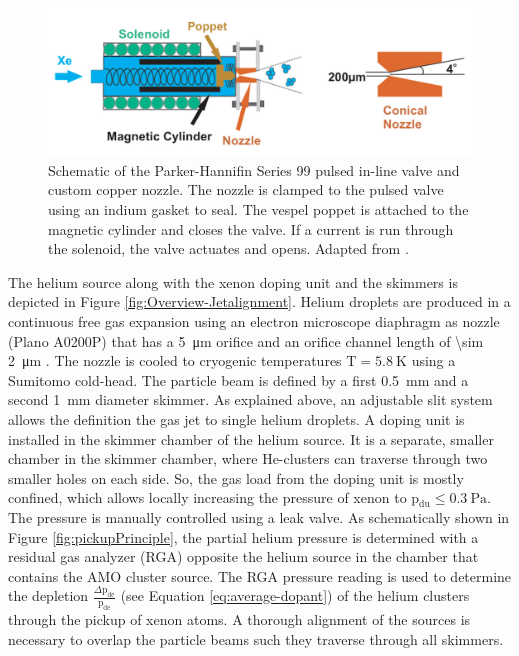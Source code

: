 \begin{figure}
	\centering
		\includegraphics[width=1.00\textwidth]{images/parker-valve.jpg}
	\caption[Schematic of the Parker-Hannifin Series 99 valve.]{Schematic of the Parker-Hannifin Series 99 pulsed in-line valve and custom copper nozzle. The nozzle is clamped to the pulsed valve using an indium gasket to seal. The vespel poppet is attached to the magnetic cylinder and closes the valve. If a current is run through the solenoid, the valve actuates and opens. Adapted from \citep[\href{http://creativecommons.org/licenses/by-nc/3.0/us}{\ccbync}]{Ferguson-2016-PhD}.}
	\label{fig:parker-valve}
\end{figure}
The helium source along with the xenon doping unit and the skimmers is depicted in Figure \ref{fig:Overview-Jetalignment}. Helium droplets are produced in a continuous free gas expansion using an electron microscope diaphragm as nozzle (Plano A0200P) that has a \SI{5}{\micro\meter} orifice and an orifice channel length of \SI{\sim 2}{\micro\meter} \citep{Gomez-2011-JCP}. The nozzle is cooled to cryogenic temperatures $\text{T}= \SI{5.8}{\kelvin}$ using a Sumitomo cold-head. The particle beam is defined by a first \SI{0.5}{\milli\meter} and a second \SI{1}{\milli\meter} diameter skimmer. As explained above, an adjustable slit system allows the definition the gas jet to single helium droplets. A doping unit is installed in the skimmer chamber of the helium source. It is a separate, smaller chamber in the skimmer chamber, where He-clusters can traverse through two smaller holes on each side. So, the gas load from the doping unit is mostly confined, which allows locally increasing the pressure of xenon to p$_{\text{du}}\leq \SI{0.3}{\pascal}$. The pressure is manually controlled using a leak valve. As schematically shown in Figure \ref{fig:pickupPrinciple}, the partial helium pressure is determined with a residual gas analyzer (RGA) opposite the helium source in the chamber that contains the AMO cluster source. The RGA pressure reading is used to determine the depletion $\tfrac{\Delta \text{p}_{\text{de}}}{\text{p}_{\text{de}}}$ (see Equation \eqref{eq:average-dopant}) of the helium clusters through the pickup of xenon atoms. A thorough alignment of the sources is necessary to overlap the particle beams such they traverse through all skimmers.%
%
%
%

